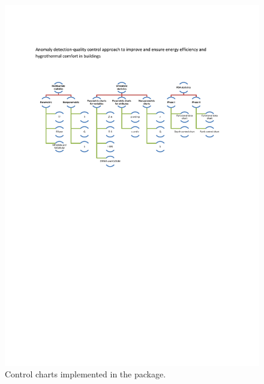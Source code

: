 \begin{figure}[h!]
		\centering	\includegraphics[width=1\linewidth]{graficos2.PDF}
        \caption{Control charts implemented in the  package.}
        \label{types}
	\end{figure}
    
